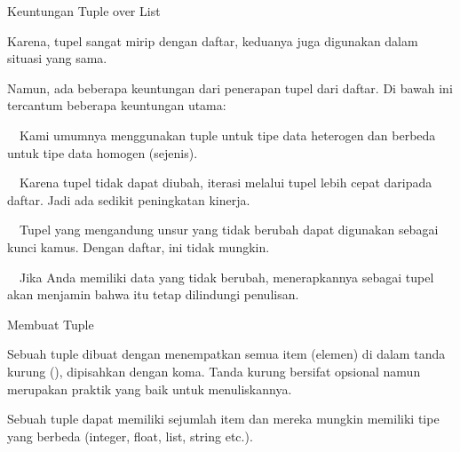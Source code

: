 \documentclass[a4paper,12pt]{report}
\begin{document}
\noindent 
{\fontsize{14pt}{14pt}\selectfont Keuntungan Tuple over List \\} \par
\noindent 
\vspace{14pt}
\noindent 
{\fontsize{14pt}{14pt}\selectfont Karena, tupel sangat mirip dengan daftar, keduanya juga digunakan dalam situasi yang sama. \\} \par
\noindent 
\vspace{14pt}
\noindent 
{\fontsize{14pt}{14pt}\selectfont Namun, ada beberapa keuntungan dari penerapan tupel dari daftar. Di bawah ini tercantum beberapa keuntungan utama: \\} \par
\noindent 
\vspace{14pt}
\noindent 
{\fontsize{14pt}{14pt}\selectfont  $  $ $  $ $  $ $  $Kami umumnya menggunakan tuple untuk tipe data heterogen dan berbeda untuk tipe data homogen (sejenis). \\} \par
\noindent 
{\fontsize{14pt}{14pt}\selectfont  $  $ $  $ $  $ $  $Karena tupel tidak dapat diubah, iterasi melalui tupel lebih cepat daripada daftar. Jadi ada sedikit peningkatan kinerja. \\} \par
\noindent 
{\fontsize{14pt}{14pt}\selectfont  $  $ $  $ $  $ $  $Tupel yang mengandung unsur yang tidak berubah dapat digunakan sebagai kunci kamus. Dengan daftar, ini tidak mungkin. \\} \par
\noindent 
{\fontsize{14pt}{14pt}\selectfont  $  $ $  $ $  $ $  $Jika Anda memiliki data yang tidak berubah, menerapkannya sebagai tupel akan menjamin bahwa itu tetap dilindungi penulisan. \\} \par
\noindent 
\vspace{14pt}
\noindent 
{\fontsize{14pt}{14pt}\selectfont Membuat Tuple \\} \par
\noindent 
\vspace{14pt}
\noindent 
{\fontsize{14pt}{14pt}\selectfont Sebuah tuple dibuat dengan menempatkan semua item (elemen) di dalam tanda kurung (), dipisahkan dengan koma. Tanda kurung bersifat opsional namun merupakan praktik yang baik untuk menuliskannya. \\} \par
\noindent 
\vspace{14pt}
\noindent 
{\fontsize{14pt}{14pt}\selectfont Sebuah tuple dapat memiliki sejumlah item dan mereka mungkin memiliki tipe yang berbeda (integer, float, list, string etc.). \\} \par
\end{document}
